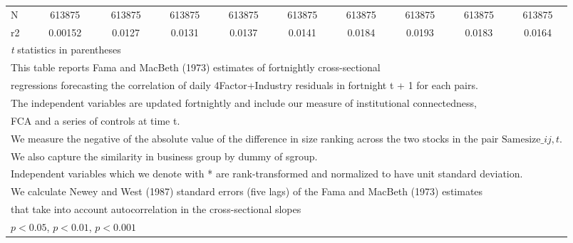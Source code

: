 {\begin{tabular}{l*{9}{c}}
N                   &      613875         &      613875         &      613875         &      613875         &      613875         &      613875         &      613875         &      613875         &      613875         \\
r2                  &     0.00152         &      0.0127         &      0.0131         &      0.0137         &      0.0141         &      0.0184         &      0.0193         &      0.0183         &      0.0164         \\
\hline\hline
\multicolumn{10}{l}{\footnotesize \textit{t} statistics in parentheses}\\
\multicolumn{10}{l}{\footnotesize This table reports Fama and MacBeth (1973) estimates of fortnightly cross-sectional}\\
\multicolumn{10}{l}{\footnotesize  regressions forecasting the correlation of daily 4Factor+Industry residuals in fortnight t + 1 for each pairs.}\\
\multicolumn{10}{l}{\footnotesize The independent variables are updated fortnightly and include our measure of institutional connectedness,}\\
\multicolumn{10}{l}{\footnotesize  FCA and a series of controls at time t.}\\
\multicolumn{10}{l}{\footnotesize We measure the negative of the absolute value of the difference in size ranking across the two stocks in the pair $ \text{Samesize}\_{ij,t} $.}\\
\multicolumn{10}{l}{\footnotesize We also capture the similarity in business group by dummy of sgroup.}\\
\multicolumn{10}{l}{\footnotesize Independent variables which  we denote with * are rank-transformed and normalized to have unit standard deviation.}\\
\multicolumn{10}{l}{\footnotesize  We calculate Newey and West (1987) standard errors (five lags) of the Fama and MacBeth (1973) estimates }\\
\multicolumn{10}{l}{\footnotesize  that take into account autocorrelation in the cross-sectional slopes}\\
\multicolumn{10}{l}{\footnotesize \sym{*} \(p<0.05\), \sym{**} \(p<0.01\), \sym{***} \(p<0.001\)}\\
\end{tabular}
}
